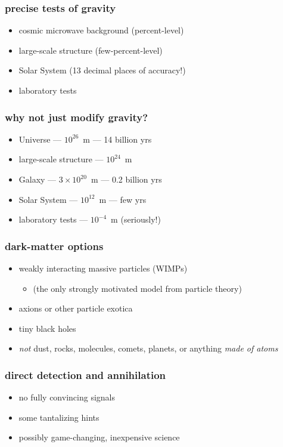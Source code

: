 \documentclass{beamer}
\begin{document}
\begin{frame}
\frametitle{precise tests of gravity}
\begin{itemize}
\item cosmic microwave background (percent-level)
\item large-scale structure (few-percent-level)
\item Solar System (13 decimal places of accuracy!)
\item laboratory tests
\end{itemize}
\end{frame}

\begin{frame}
\frametitle{why not just modify gravity?}
\begin{itemize}
\item Universe --- $10^{26}$~m --- 14 billion yrs
\item large-scale structure --- $10^{24}$~m
\item Galaxy --- $3\times 10^{20}$~m --- 0.2 billion yrs
\item Solar System --- $10^{12}$~m --- few yrs
\item laboratory tests --- $10^{-4}$~m (seriously!)
\end{itemize}
\end{frame}

\begin{frame}
\frametitle{dark-matter options}
\begin{itemize}
\item weakly interacting massive particles (WIMPs)
  \begin{itemize}
  \item (the only strongly motivated model from particle theory)
  \end{itemize}
\item axions or other particle exotica
\item tiny black holes
\item \emph{not} dust, rocks, molecules, comets, planets, or anything \emph{made of atoms}
\end{itemize}
\end{frame}

\begin{frame}
\frametitle{direct detection and annihilation}
\begin{itemize}
\item no fully convincing signals
\item some tantalizing hints
\item possibly game-changing, inexpensive science
\end{itemize}
\end{frame}

{\begin{frame}[plain]~\end{frame}}

{\begin{frame}[plain]~\end{frame}}
\end{document}
